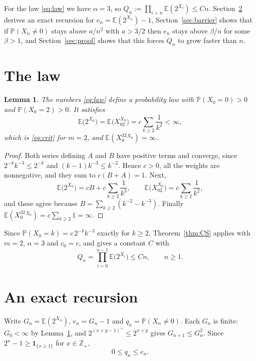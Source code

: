 \documentclass[11pt]{amsart}
\newtheorem{lemma}[theorem]{Lemma}
\theoremstyle{definition}
\theoremstyle{remark}
\numberwithin{equation}{section}
\newcommand{\Pp}{\mathbb P}
\newcommand{\E}{\mathbb E}
\newcommand{\Z}{\mathbb Z}
\begin{document}
For the law \eqref{eq:law} we have $\alpha=3$, so $Q_n:=\prod_{i<n}\E(2^{X_i})\le Cn$. Section~\ref{sec:rec} derives an exact recursion for $e_n=\E(2^{X_n})-1$, Section~\ref{sec:barrier} shows that if $\Pp(X_n\ne0)$ stays above $a/n^2$ with $a>3/2$ then $e_n$ stays above $\beta/n$ for some $\beta>1$, and Section~\ref{sec:proof} shows that this forces $Q_n$ to grow faster than $n$.

\section{The law}\label{sec:law}

\begin{lemma}\label{lem:law}
The numbers \eqref{eq:law} define a probability law with $\Pp(X_0=0)>0$ and $\Pp(X_0=2)>0$. It satisfies
\[
\E\bigl(2^{X_0}\bigr)=\E\bigl(X_02^{X_0}\bigr)=c\sum_{k\ge2}\frac1{k^2}<\infty,
\]
which is \eqref{eq:crit} for $m=2$, and $\E(X_0^32^{X_0})=\infty$.
\end{lemma}

\begin{proof}
Both series defining $A$ and $B$ have positive terms and converge, since $2^{-k}k^{-3}\le2^{-k}$ and $(k-1)k^{-3}\le k^{-2}$. Hence $c>0$, all the weights are nonnegative, and they sum to $c(B+A)=1$. Next,
\[
\E\bigl(2^{X_0}\bigr)=cB+c\sum_{k\ge2}\frac1{k^3},\qquad \E\bigl(X_02^{X_0}\bigr)=c\sum_{k\ge2}\frac1{k^2},
\]
and these agree because $B=\sum_{k\ge2}(k^{-2}-k^{-3})$. Finally $\E(X_0^32^{X_0})=c\sum_{k\ge2}1=\infty$.
\end{proof}

Since $\Pp(X_0=k)=c\,2^{-k}k^{-3}$ exactly for $k\ge2$, Theorem~\ref{thm:CS} applies with $m=2$, $\alpha=3$ and $c_0=c$, and gives a constant $C$ with
\begin{equation}\label{eq:Qupper}
Q_n=\prod_{i=0}^{n-1}\E\bigl(2^{X_i}\bigr)\le Cn,\qquad n\ge1.
\end{equation}

\section{An exact recursion}\label{sec:rec}

Write $G_n=\E(2^{X_n})$, $e_n=G_n-1$ and $q_n=\Pp(X_n\ne0)$. Each $G_n$ is finite: $G_0<\infty$ by Lemma~\ref{lem:law}, and $2^{(x+y-1)^+}\le2^{x+y}$ gives $G_{n+1}\le G_n^2$. Since $2^x-1\ge\mathbf 1_{\{x\ge1\}}$ for $x\in\Z_+$,
\begin{equation}\label{eq:qe}
0\le q_n\le e_n .
\end{equation}
\end{document}

